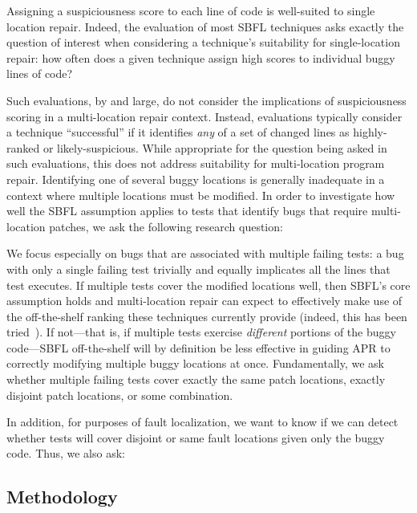 \documentclass[10pt, conference]{IEEEtran}
\begin{document}
Assigning a suspiciousness score to each line of code is well-suited to single
location repair. Indeed, the evaluation of most SBFL techniques asks exactly the
question of interest when considering a technique's suitability for
single-location repair: how often does a given technique assign high scores to 
individual buggy lines of code?

Such evaluations, by and large, do not consider the implications of
suspiciousness scoring in a multi-location repair context.  Instead, evaluations
typically consider a technique ``successful'' if it identifies \emph{any} of a
set of changed lines as highly-ranked or likely-suspicious.  While appropriate
for the question being asked in such evaluations, this does not address
suitability for multi-location program repair.  Identifying one of several buggy
locations is generally inadequate in a context where multiple locations must be
modified. In order to investigate how well the SBFL assumption
applies to tests that identify bugs that require multi-location patches, we ask 
the following research question:



We focus especially on bugs that are associated with multiple failing tests: a bug
with only a single failing test trivially and equally implicates all the lines
that test executes.  If multiple tests cover the modified locations well, then
SBFL's core assumption holds and multi-location repair can expect to effectively
make use of the off-the-shelf ranking these techniques currently provide
(indeed, this has been tried~\cite{angelix}). If not---that is, if multiple
tests exercise \emph{different} portions of the buggy code---SBFL off-the-shelf
will by definition be less effective in guiding APR to correctly modifying
multiple buggy locations at once.
Fundamentally, we ask whether multiple failing tests cover exactly the same
patch locations, exactly disjoint patch locations, or some combination.

In addition, for purposes of fault localization, we want to know if we can detect 
whether tests will cover disjoint or same fault locations given only the buggy code. 
Thus, we also ask:


\subsection{Methodology}
\end{document}
